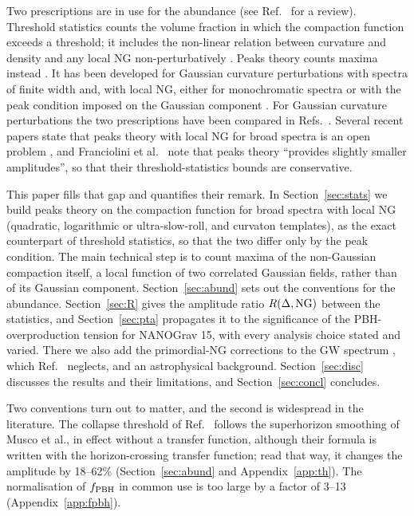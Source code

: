 \documentclass{article}
\newcommand{\fpbh}{f_{\rm PBH}}
\begin{document}
Two prescriptions are in use for the abundance (see Ref.~\cite{CIPVV26} for a review). Threshold
statistics counts the volume fraction in which the compaction function \cite{SS99,Harada15}
exceeds a threshold; it includes the non-linear relation between curvature and density
\cite{Young19,DeLuca19} and any local NG non-perturbatively \cite{Ferrante,Ianniccari}. Peaks
theory counts maxima instead \cite{BBKS,Yoo18}. It has been developed for Gaussian curvature
perturbations with spectra of finite width \cite{Yoo20,GS20,Pi25,Kushwaha,ColeFumagalli} and, with
local NG, either for monochromatic spectra \cite{Young22,Kitajima,Inui} or with the peak condition
imposed on the Gaussian component \cite{AGM19,YGY19,Riccardi}. For Gaussian curvature
perturbations the two prescriptions have been compared in Refs.~\cite{Gow21,Ianniccari,Kushwaha,Iovino24}.
Several recent papers state that peaks theory with local NG for broad spectra is an open problem
\cite{Ianniccari,Iovino24,IPV25,Pi25,ColeFumagalli,GTV25}, and Franciolini et al.~\cite{FIVT23}
note that peaks theory ``provides slightly smaller amplitudes'', so that their threshold-statistics
bounds are conservative.

This paper fills that gap and quantifies their remark. In Section~\ref{sec:stats} we build peaks
theory on the compaction function for broad spectra with local NG (quadratic, logarithmic or
ultra-slow-roll, and curvaton templates), as the exact counterpart of threshold statistics, so
that the two differ only by the peak condition. The main technical step is to count maxima of the
non-Gaussian compaction itself, a local function of two correlated Gaussian fields, rather than
of its Gaussian component. Section~\ref{sec:abund} sets out the conventions for the abundance.
Section~\ref{sec:R} gives the amplitude ratio $R(\Delta,{\rm NG})$ between the statistics, and
Section~\ref{sec:pta} propagates it to the significance of the PBH-overproduction tension for
NANOGrav 15, with every analysis choice stated and varied. There we also add the primordial-NG
corrections to the GW spectrum \cite{CPS19,Unal19,ALW21}, which Ref.~\cite{FIVT23} neglects, and an
astrophysical background. Section~\ref{sec:disc} discusses the results and their limitations,
and Section~\ref{sec:concl} concludes.

Two conventions turn out to matter, and the second is widespread in the literature. The collapse
threshold of Ref.~\cite{FIVT23} follows the superhorizon smoothing of Musco et al., in effect
without a transfer function, although their formula is written with the horizon-crossing transfer
function; read that way, it changes the amplitude by 18--62\% (Section~\ref{sec:abund} and
Appendix~\ref{app:th}). The normalisation of $\fpbh$ in common use is too large by a factor of
3--13 (Appendix~\ref{app:fpbh}).
\end{document}
